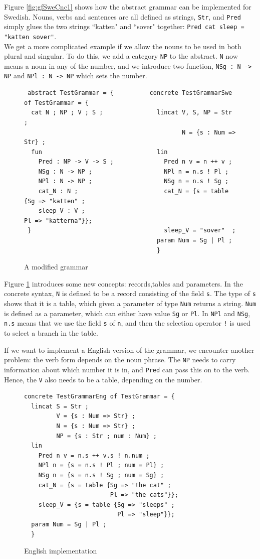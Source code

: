 \documentclass{report}
\begin{document}
Figure \ref{fig:gfSweCnc1} shows how the abstract grammar can be implemented
for Swedish. Nouns, verbs and sentences are all defined as strings, \verb|Str|,
and \verb|Pred| simply glues the two strings ``katten" and ``sover" together:
\verb|Pred cat sleep = "katten sover"|.\\
We get a more complicated example if we allow the nouns to be used in both
plural and singular. To do this, we add a category \verb|NP| to the
abstract. \verb|N| now means a noun
in any of the number, and we introduce two function, \verb|NSg : N -> NP| and
\verb|NPl : N -> NP| which sets the number.
\begin{figure}[h!]
\begin{verbatim}              
 abstract TestGrammar = {          concrete TestGrammarSwe of TestGrammar = {
  cat N ; NP ; V ; S ;               lincat V, S, NP = Str ;
                                            N = {s : Num => Str} ;
  fun                                lin   
    Pred : NP -> V -> S ;              Pred n v = n ++ v ;
    NSg : N -> NP ;                    NPl n = n.s ! Pl ;
    NPl : N -> NP ;                    NSg n = n.s ! Sg ;
    cat_N : N ;                        cat_N = {s = table {Sg => "katten" ;
    sleep_V : V ;                                          Pl => "katterna"}};
 }                                     sleep_V = "sover"  ;
                                     param Num = Sg | Pl ;
                                     }
\end{verbatim}           
\caption{A modified grammar}
\label{fig:gfTest2}
\end{figure}
Figure \ref{fig:gfTest2} introduces some new concepts: records,tables and parameters.
In the concrete syntax, \verb|N| is defined to be a record consisting of the field
\verb|s|. The type of \verb|s| shows that it is a table, which given a parameter of type \verb|Num| returns
a string. \verb|Num| is defined as a parameter, which can either have value \verb|Sg|
or \verb|Pl|. In \verb|NPl| and \verb|NSg|, \verb|n.s| means that we use the
field \verb|s| of \verb|n|, and then the selection operator \verb|!| is used to
select a branch in the table.

If we want to implement a English version of the grammar, we encounter another
problem: the verb form depends on the noun phrase. The \verb|NP| needs to carry
information about which number it is in, and \verb|Pred| can pass this on to the
verb. Hence, the \verb|V| also needs to be a table, depending on the number.
\begin{figure}[h!]
\begin{verbatim}              
concrete TestGrammarEng of TestGrammar = {
  lincat S = Str ;
         V = {s : Num => Str} ;
         N = {s : Num => Str} ;
         NP = {s : Str ; num : Num} ;
  lin   
    Pred n v = n.s ++ v.s ! n.num ;
    NPl n = {s = n.s ! Pl ; num = Pl} ;
    NSg n = {s = n.s ! Sg ; num = Sg} ;
    cat_N = {s = table {Sg => "the cat" ;
                        Pl => "the cats"}};
    sleep_V = {s = table {Sg => "sleeps" ; 
                          Pl => "sleep"}};
  param Num = Sg | Pl ;
  }
\end{verbatim}           
\caption{English implementation}
\label{fig:gfTestEng}
\end{figure}
\end{document}
